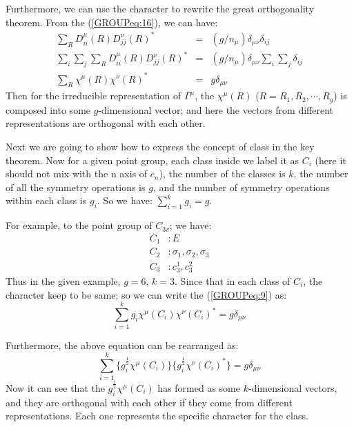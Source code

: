 Furthermore, we can use the character to rewrite the great
orthogonality theorem. From the (\ref{GROUPeq:16}), we can have:
\begin{eqnarray}\label{GROUPeq:9}
  \sum_{R} D^{\mu}_{ii}(R) D^{\nu}_{jj}(R)^{*} &=&  (g/n_{\mu})\delta_{\mu\nu}
  \delta_{ij}  \nonumber \\
  \sum_{i}\sum_{j}\sum_{R} D^{\mu}_{ii}(R) D^{\nu}_{jj}(R)^{*} &=&
  (g/n_{\mu})\delta_{\mu\nu}\sum_{i}\sum_{j}\delta_{ij}  \nonumber \\
  \sum_{R}\chi^{\mu}(R)\chi^{\nu}(R)^{*} &=&  g\delta_{\mu\nu}
\end{eqnarray}
Then for the irreducible representation of $\Gamma^{\mu}$, the
$\chi^{\mu}(R)$ ($R = R_{1}, R_{2}, \cdots, R_{g}$) is composed into
some $g$-dimensional vector; and here the vectors from different
representations are orthogonal with each other.

Next we are going to show how to express the concept of class in the
key theorem. Now for a given point group, each class inside we label
it as $C_{i}$ (here it should not mix with the n axis of $c_{n}$), the
number of the classes is $k$, the number of all the symmetry
operations is $g$, and the number of symmetry operations within each
class is $g_{i}$. So we have: $\sum_{i=1}^{k} g_{i} = g$.

For example, to the point group of $C_{3v}$; we have:
\begin{align}\label{}
  C_{1} &: E \nonumber \\
  C_{2} &: \sigma_{1}, \sigma_{2}, \sigma_{3} \nonumber \\
  C_{3} &: c^{1}_{3},c^{2}_{3}
\end{align}
Thus in the given example, $g=6$, $k=3$. Since that in each class of
$C_{i}$, the character keep to be same; so we can write the
(\ref{GROUPeq:9}) as:
\begin{equation}\label{}
  \sum_{i=1}^{k}g_{i}\chi^{\mu}(C_{i})\chi^{\nu}(C_{i})^{*} =
  g\delta_{\mu\nu}
\end{equation}

Furthermore, the above equation can be rearranged as:
\begin{equation}\label{}
  \sum_{i=1}^{k}\{g_{i}^{\frac{1}{2}}\chi^{\mu}(C_{i})\}
  \{g_{i}^{\frac{1}{2}}\chi^{\nu}(C_{i})^{*}\}
  = g\delta_{\mu\nu}
\end{equation}
Now it can see that the $g_{i}^{\frac{1}{2}}\chi^{\mu}(C_{i})$ has
formed as some $k$-dimensional vectors, and they are orthogonal with
each other if they come from different representations. Each one
represents the specific character for the class.


